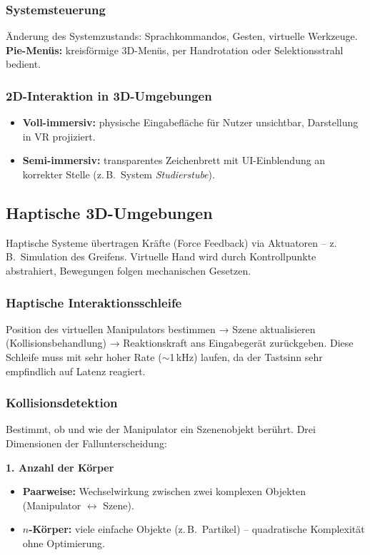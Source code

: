 \documentclass[12pt, a4paper]{article}
\begin{document}
\subsubsection*{Systemsteuerung}
Änderung des Systemzustands: Sprachkommandos, Gesten, virtuelle Werkzeuge. \textbf{Pie-Menüs:} kreisförmige 3D-Menüs, per Handrotation oder Selektionsstrahl bedient.

\subsubsection*{2D-Interaktion in 3D-Umgebungen}
\begin{itemize}
  \item \textbf{Voll-immersiv:} physische Eingabefläche für Nutzer unsichtbar, Darstellung in VR projiziert.
  \item \textbf{Semi-immersiv:} transparentes Zeichenbrett mit UI-Einblendung an korrekter Stelle (z.\,B.\ System \textit{Studierstube}).
\end{itemize}

\subsection{Haptische 3D-Umgebungen}

Haptische Systeme übertragen Kräfte (Force Feedback) via Aktuatoren -- z.\,B.\ Simulation des Greifens. Virtuelle Hand wird durch Kontrollpunkte abstrahiert, Bewegungen folgen mechanischen Gesetzen.

\subsubsection*{Haptische Interaktionsschleife}

Position des virtuellen Manipulators bestimmen → Szene aktualisieren (Kollisionsbehandlung) → Reaktionskraft ans Eingabegerät zurückgeben. Diese Schleife muss mit sehr hoher Rate ($\sim$1\,kHz) laufen, da der Tastsinn sehr empfindlich auf Latenz reagiert.

\subsubsection*{Kollisionsdetektion}

Bestimmt, ob und wie der Manipulator ein Szenenobjekt berührt. Drei Dimensionen der Fallunterscheidung:

\textbf{1. Anzahl der Körper}
\begin{itemize}
  \item \textbf{Paarweise:} Wechselwirkung zwischen zwei komplexen Objekten (Manipulator $\leftrightarrow$ Szene).
  \item \textbf{$n$-Körper:} viele einfache Objekte (z.\,B.\ Partikel) -- quadratische Komplexität ohne Optimierung.
\end{itemize}
\end{document}
